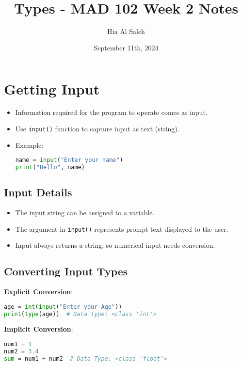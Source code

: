 \documentclass{article}
\title{Types - MAD 102 Week 2 Notes}
\author{Hia Al Saleh}
\date{September 11th, 2024}
\begin{document}
\maketitle
\tableofcontents
\newpage 

\section{Getting Input}
\begin{itemize}
    \item Information required for the program to operate comes as input.
    \item Use \texttt{input()} function to capture input as text (string).
    \item Example:
\begin{lstlisting}[language=python]
name = input("Enter your name")
print("Hello", name)
    \end{lstlisting}
\end{itemize}

\subsection{Input Details}
\begin{itemize}
    \item The input string can be assigned to a variable.
    \item The argument in \texttt{input()} represents prompt text displayed to the user.
    \item Input always returns a string, so numerical input needs conversion.
\end{itemize}

\subsection{Converting Input Types}
\textbf{Explicit Conversion}:
\begin{lstlisting}[language=python]
age = int(input("Enter your Age"))
print(type(age))  # Data Type: <class 'int'>
\end{lstlisting}

\textbf{Implicit Conversion}:
\begin{lstlisting}[language=python]
num1 = 1
num2 = 3.4
sum = num1 + num2  # Data Type: <class 'float'>
\end{lstlisting}
\end{document}
